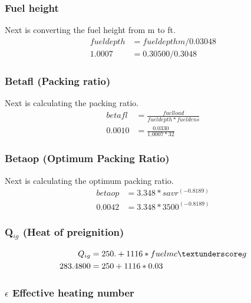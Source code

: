 \documentclass{article}
\begin{document}
\subsubsection{Fuel height}
Next is converting the fuel height from m to ft. 
\begin{equation}
	\label{fuel_depth_m}
	\begin{split}
		fueldepth &= fueldepthm / 0.03048 \\
		1.0007 &= 0.30500 / 0.3048
	\end{split}
\end{equation}


\subsubsection{Betafl (Packing ratio)}
Next is calculating the packing ratio. 
\begin{equation}
	\begin{split}
		betafl &= \frac{fuelload}{fueldepth * fueldens} \\
		0.0010 &= \frac{0.0330}{1.0007 * 32}
	\end{split}
\end{equation}

\subsubsection{Betaop (Optimum Packing Ratio)}
Next is calculating the optimum packing ratio. 
\begin{equation}
\label{betafl_WRF}
	\begin{split}
		betaop &= 3.348 * savr^{(-0.8189)} \\
		0.0042 &= 3.348 * 3500 ^ {(-0.8189)}
	\end{split}
\end{equation}

\subsubsection{Q$_{ig}$ (Heat of preignition)}
\begin{equation}
	\begin{split}
		Q_{ig} &= 250. + 1116 * fuelmc \textunderscore g \\
		283.4800 &= 250 + 1116 * 0.03
	\end{split}
\end{equation}

\subsubsection{$\epsilon$ Effective heating number}
\end{document}
